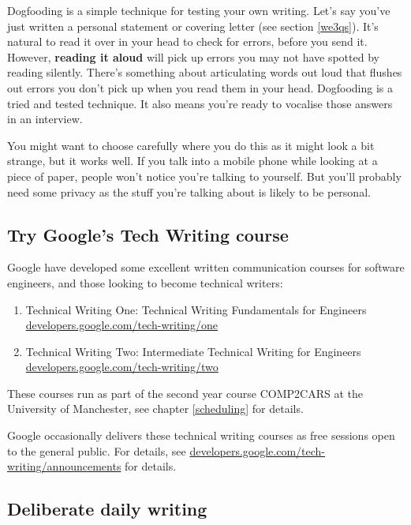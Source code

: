\documentclass[
]{book}
\providecommand{\tightlist}{%
  \setlength{\itemsep}{0pt}\setlength{\parskip}{0pt}}
\begin{document}
Dogfooding is a simple technique for testing your own writing. Let's say you've just written a personal statement or covering letter (see section \ref{we3qs}). It's natural to read it over in your head to check for errors, before you send it. However, \textbf{reading it aloud} will pick up errors you may not have spotted by reading silently. There's something about articulating words out loud that flushes out errors you don't pick up when you read them in your head. Dogfooding is a tried and tested technique. It also means you're ready to vocalise those answers in an interview.

You might want to choose carefully where you do this as it might look a bit strange, but it works well. If you talk into a mobile phone while looking at a piece of paper, people won't notice you're talking to yourself. But you'll probably need some privacy as the stuff you're talking about is likely to be personal.

\hypertarget{techwriting}{%
\subsection{Try Google's Tech Writing course}\label{techwriting}}

Google have developed some excellent written communication courses for software engineers, and those looking to become technical writers:

\begin{enumerate}
\def\labelenumi{\arabic{enumi}.}
\tightlist
\item
  Technical Writing One: Technical Writing Fundamentals for Engineers \href{https://developers.google.com/tech-writing/one}{developers.google.com/tech-writing/one}
\item
  Technical Writing Two: Intermediate Technical Writing for Engineers \href{https://developers.google.com/tech-writing/two}{developers.google.com/tech-writing/two}
\end{enumerate}

These courses run as part of the second year course COMP2CARS at the University of Manchester, see chapter \ref{scheduling} for details.

Google occasionally delivers these technical writing courses as free sessions open to the general public. For details, see \href{https://developers.google.com/tech-writing/announcements}{developers.google.com/tech-writing/announcements} for details.

\hypertarget{dailywrite}{%
\subsection{Deliberate daily writing}\label{dailywrite}}
\end{document}
